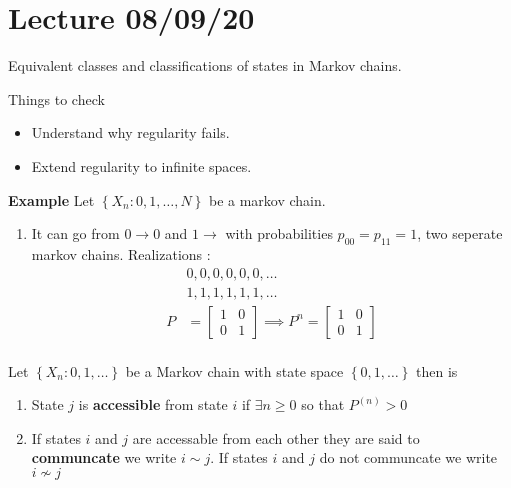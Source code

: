 \documentclass{article}
\theoremstyle{remark}
\newcommand{\newpara}
  {
  \vskip 0.4cm
  }
\begin{document}
\section{Lecture 08/09/20}%
\label{sec:lecture_08_09_20}

Equivalent classes and classifications of states in Markov chains.


\newpara
Things to check
\begin{itemize}
  \item Understand why regularity fails.
  \item Extend regularity to infinite spaces.
\end{itemize}

\textbf{Example}
Let $\left\{ X_{n}: 0,1,\ldots,N \right\}$ be a markov chain.

\begin{enumerate}[label=(\alph*)]
  \item It can go from $0\to 0$ and $1\to $ with probabilities $p_{00} = p_{11} = 1$, two seperate markov chains. Realizations : \[
  \begin{split}
      &  0, 0,0,0,0,0,    \ldots\\
      &  1,1,1,1,1,1,  \ldots  \\
    P &= \begin{bmatrix}
    1  &  0 \\
    0  &  1
    \end{bmatrix}  \implies  P^{n} = \begin{bmatrix}
    1  &  0 \\
    0  &  1
    \end{bmatrix}
     \\
  \end{split}
  \]
\end{enumerate}

\begin{definition}
  Let $\left\{ X_{n}: 0, 1 , \ldots \right\}$ be a Markov chain with state space $\left\{ 0, 1 , \ldots \right\}$ then is
  \begin{enumerate}[label=(\roman*)]
    \item State $j$ is \textbf{ accessible}  from state $i $ if $\exists n \ge 0$  so that $P^{(n)} > 0$
    \item If states $i$ and $j$ are accessable from each other they are said to \textbf{communcate }  we write $ i \sim j$. If states $i$ and $j$ do not communcate we write $i \not \sim  j$
  \end{enumerate}
\end{definition}
\end{document}
